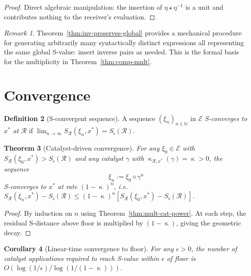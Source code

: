 \documentclass[twocolumn,11pt,a4paper]{article}
\theoremstyle{thmstyle}
\newtheorem{theorem}{Theorem}[section]
\newtheorem{corollary}[theorem]{Corollary}
\theoremstyle{thmstyle}
\theoremstyle{definition}
\newtheorem{definition}[theorem]{Definition}
\theoremstyle{remark}
\newtheorem{remark}[theorem]{Remark}
\DeclareMathOperator{\catpow}{\kappa}
\newcommand{\Natural}{\mathbb{N}}
\newcommand{\Expr}{\mathcal{E}}
\newcommand{\receiver}{\mathcal{R}}
\newcommand{\Sscalar}{S}
\newcommand{\Sfloor}{S_{\flat}}
\begin{document}
\begin{proof}
Direct algebraic manipulation: the insertion of
$\eta \star \eta^{-1}$ is a unit and contributes
nothing to the receiver's evaluation.
\end{proof}

\begin{remark}\label{rem:invertible-comp}
Theorem~\ref{thm:inv-preserves-global} provides a
mechanical procedure for generating arbitrarily
many syntactically distinct expressions all
representing the same global S-value: insert
inverse pairs as needed.  This is the formal
basis for the multiplicity in
Theorem~\ref{thm:comp-mult}.
\end{remark}

\section{Convergence}
\label{sec:convergence}

\begin{definition}[S-convergent sequence]\label{def:s-convergent}
A sequence $(\xi_{n})_{n \in \Natural}$ in $\Expr$
\emph{S-converges to $x^{*}$ at $\receiver$} if
$\lim_{n \to \infty} \Sscalar_{\receiver}(\xi_{n},
x^{*}) = \Sfloor(\receiver)$.
\end{definition}

\begin{theorem}[Catalyst-driven convergence]
\label{thm:cat-conv}
For any $\xi_{0} \in \Expr$ with
$\Sscalar_{\receiver}(\xi_{0}, x^{*}) >
\Sfloor(\receiver)$ and any catalyst $\gamma$ with
$\catpow_{\receiver, x^{*}}(\gamma) = \catpow > 0$,
the sequence
\[
\xi_{n} := \xi_{0} \diamond \gamma^{n}
\]
S-converges to $x^{*}$ at rate
$(1 - \catpow)^{n}$, i.e.\
$\Sscalar_{\receiver}(\xi_{n}, x^{*}) -
\Sfloor(\receiver) \leq (1 - \catpow)^{n}
[\Sscalar_{\receiver}(\xi_{0}, x^{*}) -
 \Sfloor(\receiver)]$.
\end{theorem}

\begin{proof}
By induction on $n$ using
Theorem~\ref{thm:mult-cat-power}.  At each step,
the residual S-distance above floor is multiplied
by $(1 - \catpow)$, giving the geometric decay.
\end{proof}

\begin{corollary}[Linear-time convergence to floor]
\label{cor:linear-conv}
For any $\epsilon > 0$, the number of catalyst
applications required to reach S-value within
$\epsilon$ of floor is
$O(\log(1/\epsilon) / \log(1/(1-\catpow)))$.
\end{corollary}
\end{document}
